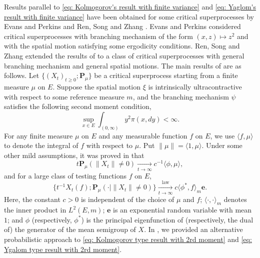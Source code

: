 \documentclass[12pt, a4paper]{amsart}
\theoremstyle{definition}
\numberwithin{equation}{section}
\begin{document}
	Results parallel to \eqref{eq: Kolmogorov's result with finite variance} and \eqref{eq: Yaglom's result with finite variance} have been obtained for some critical superprocesses by Evans and Perkins \cite{EvansPerkins1990Measure-valued} and Ren, Song and Zhang \cite{RenSongZhang2015Limit}.
	Evans and Perkins \cite{EvansPerkins1990Measure-valued} considered critical superprocesses with branching mechanism of the form $(x,z)\mapsto z^2$ and with the spatial motion satisfying some ergodicity conditions.
	Ren, Song and Zhang \cite{RenSongZhang2015Limit} extended the results of \cite{EvansPerkins1990Measure-valued} to a class of critical superprocesses with general branching mechanism and general spatial motions. 
	The main results of \cite{RenSongZhang2015Limit} are as follows.
	Let $\{(X_t)_{t\geq 0}; \mathbf P_\mu \}$ be a critical superprocess starting from a finite measure $\mu$ on $E$.
	Suppose the spatial motion $\xi$ is intrinsically ultracontractive with respect to some reference measure $m$, and the branching mechanism $\psi$ satisfies the following second moment condition,
\begin{equation}\label{eq: second moment condition}
	\sup_{x\in E} \int_{(0,\infty)} y^2 \pi(x,dy)
	< \infty.
\end{equation}
	For any finite measure $\mu$ on $E$ and any measurable function $f$ on $E$, we use $\langle f,\mu\rangle$ to denote the integral of $f$ with respect to $\mu$. 
	Put $\|\mu\|=\langle 1, \mu\rangle$.
	Under some other mild assumptions, it was proved in  \cite{RenSongZhang2015Limit} that
\begin{equation}\label{eq: Kolmogorov type result with 2rd moment}
	t \mathbf P_\mu(\|X_t\| \neq 0)
	\xrightarrow[t\to \infty]{} c^{-1} 
\langle \phi, \mu \rangle,
\end{equation}
	and for a large class of testing functions $f$ on $E$,
\begin{equation}\label{eq: Ygalom type result with 2rd moment}
	\{ t^{-1}X_t(f); \mathbf P_\mu (\cdot |\|X_t\| \neq 0)\}
	\xrightarrow[t\to \infty]{\operatorname{law}} c \langle \phi^*, f\rangle_m \mathbf e.
\end{equation}
	Here, the constant $c > 0$ is independent of the choice of $\mu$ and $f$;
$\langle\cdot, \cdot \rangle_m$ denotes the inner product in $L^2(E, m)$;
	$\mathbf e$ is an exponential random variable with mean $1$;
	and $\phi$ (respectively, $\phi^*$) is the principal eigenfunction of (respectively, the dual of) the generator of the mean semigroup of $X$.
	In \cite{RenSongSun2017Spine}, we provided an alternative probabilistic approach to \eqref{eq: Kolmogorov type result with 2rd moment} and \eqref{eq: Ygalom type result with 2rd moment}.
	
\end{document}
